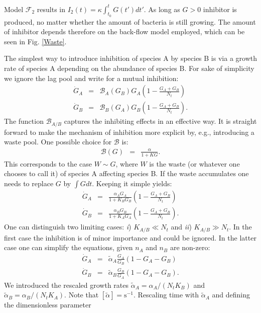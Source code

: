 \documentclass[10pt,A4paper]{article}
\begin{document}
Model $\mathcal{F}_2$ results in $I_2(t)=\kappa\int_{t_0}^tG(t')dt'$. 
As long as $G>0$ inhibitor is produced, no matter whether the amount of bacteria is still growing. 
The amount of inhibitor depends therefore on the back-flow model employed, which can be seen in Fig. \ref{Waste}. 



The simplest way to introduce inhibition of species A by species B is via a growth rate of species A depending on the abundance of species B. 
For sake of simplicity we ignore the lag pool and write for a mutual inhibition:
\begin{eqnarray}
\dot{G}_A &=& \mathcal{B}_A(G_B)G_A\left(1 - \frac{G_A+G_B}{N_t}\right )\\
\dot{G}_B &=& \mathcal{B}_B(G_A) G_B\left(1-\frac{G_A+G_B}{N_t}\right ). 
\end{eqnarray}
The function $\mathcal{B}_{A/B}$ captures the inhibiting effects in an effective way. 
It is straight forward to make the mechanism of inhibition more explicit by, e.g., introducing a waste pool. 
One possible choice for $\mathcal{B}$ is: 
\begin{eqnarray}
\mathcal{B}(G)&=&\frac{\alpha}{1+KG}. 
\end{eqnarray}
This corresponds to the case $W\sim G$, where $W$ is the waste (or whatever one chooses to call it) of species A affecting species B. 
If the waste accumulates one needs to replace $G$ by $\int G dt$. Keeping it simple yields:
\begin{eqnarray}
\dot{G}_A &=& \frac{\alpha_A G_A}{1+K_BG_B}\left(1 - \frac{G_A+G_B}{N_t}\right )\\
\dot{G}_B &=& \frac{\alpha_B G_B}{1+K_AG_A}\left(1-\frac{G_A+G_B}{N_t}\right ). 
\end{eqnarray}
One can distinguish two limiting cases: {\it i}) $K_{A/B}\ll N_t$ and {\it ii}) $K_{A/B}\gg N_t$. 
In the first case the inhibition is of minor importance and could be ignored. 
In the latter case one can simplify the equations, given $n_A$ and $n_B$ are non-zero:
\begin{eqnarray}
\label{Mut_Inhib}
\dot{G}_A &=&\tilde{\alpha}_A\frac{G_A}{G_B}\left(1 - G_A-G_B\right )\\
\dot{G}_B &=& \tilde{\alpha}_B\frac{G_B}{G_A}\left(1-G_A-G_B\right ). 
\end{eqnarray}
We introduced the rescaled growth rates $\tilde{\alpha}_A=\alpha_A/(N_tK_B)$ and $\tilde{\alpha}_B=\alpha_B/(N_tK_A)$. Note that $[\tilde{\alpha}]=\mathrm{s}^{-1}$. Rescaling time with $\tilde{\alpha}_A$ and defining the dimensionless parameter 
\end{document}
